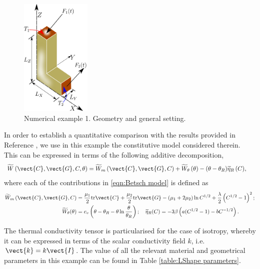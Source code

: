\begin{figure}[hbtp]
	\centering
	\includegraphics[width=0.3\textwidth]{Figures/Example1/LShape.pdf}
	\caption{Numerical example 1. Geometry and general setting.}
	\label{fig:LShape geometry}
\end{figure}
%


In order to establish a quantitative comparison with the results provided in Reference \cite{Betsch2018Thermo}, we use in this example the  constitutive model considered therein. This can be expressed in terms of the following additive decomposition,
%
\begin{equation}\label{eqn:Betsch model}
\begin{aligned}
\widetilde{W}\left(\vect{C},\vect{G},C,\theta\right)& = \widetilde{W}_{m}\left(\vect{C},\vect{G},C\right) + \widetilde{W}_{\theta}\left(\theta\right) - 
{(\theta-\theta_R)\widetilde{\eta}_R\left(C\right)},
\end{aligned}
\end{equation}
%
where each of the contributions in \eqref{eqn:Betsch model} is defined as
%
\begin{equation}\label{eqn:Betsch model II}
\begin{aligned}
 \widetilde{W}_{m}\left(\vect{C},\vect{G},C\right)&= \frac{\mu_1}{2}\text{tr}\vect{C} + \frac{\mu_2}{2}\text{tr}\vect{G} - \left(\mu_1 + 2\mu_2\right)\ln C^{1/2} + \frac{\lambda}{2}\left(C^{1/2}-1\right)^2;\\
 \widetilde{W}_{\theta}(\theta)&=c_v\left(\theta - \theta_R - \theta \ln\frac{\theta}{\theta_R}\right);\quad
 \widetilde{\eta}_R(C) = -3\beta\left(a(C^{1/2}-1) - bC^{-1/2}\right).
\end{aligned}
\end{equation}

The thermal conductivity tensor is particularised for the case of isotropy, whereby it can be expressed in terms of the scalar conductivity field $k$, i.e. $\vect{k} = k\vect{I}$. The value of all the relevant material and geometrical parameters in this example can be found in Table \ref{table:LShape parameters}.

